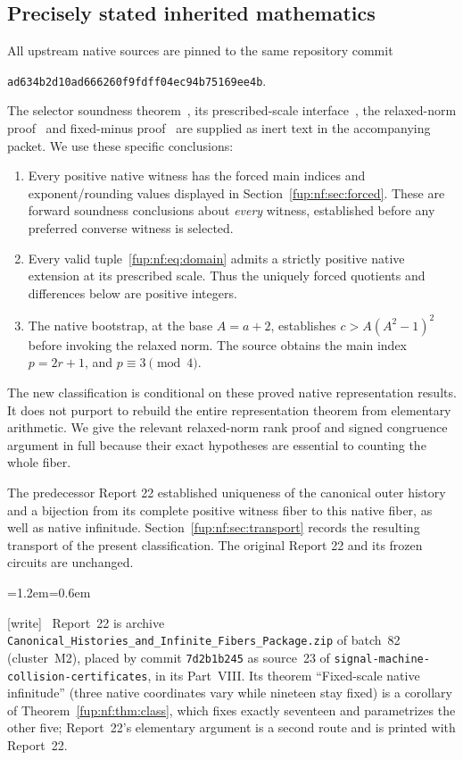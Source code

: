 \documentclass[11pt,letterpaper]{article}
\theoremstyle{definition}\newtheorem{definition}[theorem]{Definition}
\theoremstyle{remark}\newtheorem{remark}[theorem]{Remark}
\newcommand{\wtag}{\textup{[write]}}
\newenvironment{writenote}{\par\smallskip\begin{list}{}{\leftmargin=1.2em\rightmargin=0.6em}\item[]\small\wtag\ }{\end{list}\smallskip}
\newcommand{\rw}[1]{\nolinkurl{#1}}%
\begin{document}
\subsection{Precisely stated inherited mathematics}
All upstream native sources are pinned to the same repository commit
\begin{center}\small\texttt{ad634b2d10ad666260f9fdff04ec94b75169ee4b}.\end{center}
The selector soundness theorem~\cite{fup:nf:selector}, its prescribed-scale interface~\cite{fup:nf:interface}, the relaxed-norm proof~\cite{fup:nf:relaxed} and fixed-minus proof~\cite{fup:nf:parity} are supplied as inert text in the accompanying packet. We use these specific conclusions:
\begin{enumerate}
\item Every positive native witness has the forced main indices and exponent/rounding values displayed in Section~\ref{fup:nf:sec:forced}. These are forward soundness conclusions about \emph{every} witness, established before any preferred converse witness is selected.
\item Every valid tuple~\eqref{fup:nf:eq:domain} admits a strictly positive native extension at its prescribed scale. Thus the uniquely forced quotients and differences below are positive integers.
\item The native bootstrap, at the base $A=a+2$, establishes $c>A(A^2-1)^2$ before invoking the relaxed norm. The source obtains the main index $p=2r+1$, and $p\equiv3\pmod4$.
\end{enumerate}
The new classification is conditional on these proved native representation results. It does not purport to rebuild the entire representation theorem from elementary arithmetic. We give the relevant relaxed-norm rank proof and signed congruence argument in full because their exact hypotheses are essential to counting the whole fiber.

The predecessor Report 22 established uniqueness of the canonical outer history and a bijection from its complete positive witness fiber to this native fiber, as well as native infinitude. Section~\ref{fup:nf:sec:transport} records the resulting transport of the present classification. The original Report 22 and its frozen circuits are unchanged.
\begin{writenote}
Report~22 is archive \rw{Canonical_Histories_and_Infinite_Fibers_Package.zip} of batch~82 (cluster~M2), placed by commit \texttt{7d2b1b245} as source~23 of \rw{signal-machine-collision-certificates}, in its Part~VIII. Its theorem ``Fixed-scale native infinitude'' (three native coordinates vary while nineteen stay fixed) is a corollary of Theorem~\ref{fup:nf:thm:class}, which fixes exactly seventeen and parametrizes the other five; Report~22's elementary argument is a second route and is printed with Report~22.
\end{writenote}
\end{document}
